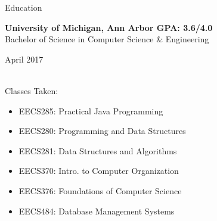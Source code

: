 \documentclass{resume} %
\begin{document}
\bigskip


\begin{rSection}{Education}

{\bf University of Michigan, Ann Arbor \hfill GPA: 3.6/4.0 \\}%
Bachelor of Science in Computer Science \& Engineering \hfill \begin{em} April 2017 \end{em}\\
Classes Taken:
\vspace{-3mm}
\begin{multicols}{2}
\begin{itemize}[noitemsep,nolistsep]
    \item EECS285: Practical Java Programming
    \item EECS280: Programming and Data Structures
    \item EECS281: Data Structures and Algorithms
    \item EECS370: Intro. to Computer Organization
    \item EECS376: Foundations of Computer Science
    \item EECS484: Database Management Systems
\end{itemize}
\end{multicols}
\vspace{-4mm}

\end{rSection}

\end{document}
